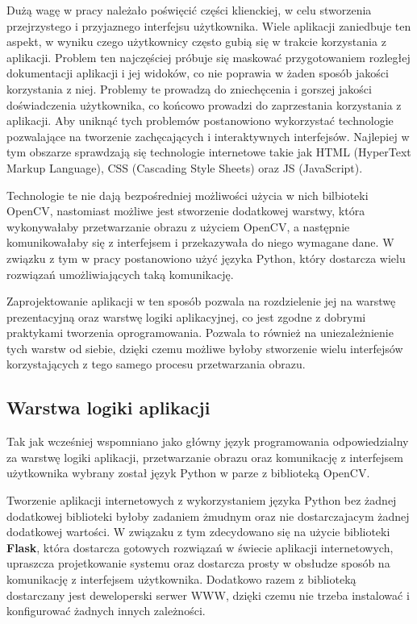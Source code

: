 \documentclass[10pt,polish,a4paper,oneside]{ppfcmthesis}
\begin{document}
Dużą wagę w pracy należało poświęci\'c części klienckiej, w celu stworzenia przejrzystego i
przyjaznego interfejsu użytkownika. Wiele aplikacji zaniedbuje ten aspekt, w wyniku czego
użytkownicy często gubią się w trakcie korzystania z aplikacji. Problem ten najczęściej próbuje
się maskowa\'c przygotowaniem rozległej dokumentacji aplikacji i jej widoków, co nie poprawia
w żaden sposób jakości korzystania z niej. Problemy te prowadzą do zniechęcenia i gorszej jakości
doświadczenia użytkownika, co końcowo prowadzi do zaprzestania korzystania z aplikacji. Aby
unikną\'c tych problemów postanowiono wykorzysta\'c technologie pozwalające na tworzenie
zachęcających i interaktywnych interfejsów. Najlepiej w tym obszarze sprawdzają się technologie
internetowe takie jak HTML (HyperText Markup Language), CSS (Cascading Style Sheets) oraz JS
(JavaScript).

Technologie te nie dają bezpośredniej możliwości użycia w nich bilbioteki OpenCV, nastomiast
możliwe jest stworzenie dodatkowej warstwy, która wykonywałaby przetwarzanie obrazu z
użyciem OpenCV, a następnie komunikowałaby się z interfejsem i przekazywała do niego
wymagane dane. W związku z tym w pracy postanowiono uży\'c języka Python, który dostarcza wielu
rozwiązań umożliwiających taką komunikację.\newline

Zaprojektowanie aplikacji w ten sposób pozwala na rozdzielenie jej na warstwę prezentacyjną
oraz warstwę logiki aplikacyjnej, co jest zgodne z dobrymi praktykami tworzenia oprogramowania.
Pozwala to również na uniezależnienie tych warstw od siebie, dzięki czemu możliwe
byłoby stworzenie wielu interfejsów korzystających z tego samego procesu przetwarzania obrazu.

\subsection{Warstwa logiki aplikacji}

Tak jak wcześniej wspomniano jako główny język programowania odpowiedzialny za warstwę logiki
aplikacji, przetwarzanie obrazu oraz komunikację z interfejsem użytkownika wybrany został język
Python w parze z biblioteką OpenCV.

Tworzenie aplikacji internetowych z wykorzystaniem języka Python bez żadnej dodatkowej
biblioteki byłoby zadaniem żmudnym oraz nie dostarczajacym żadnej dodatkowej wartości. W związaku
z tym zdecydowano się na użycie biblioteki \textbf{Flask}, która dostarcza gotowych rozwiązań
w świecie aplikacji internetowych, upraszcza projetkowanie systemu oraz dostarcza prosty w obsłudze
sposób na komunikację z interfejsem użytkownika. Dodatkowo razem z biblioteką dostarczany jest
deweloperski serwer WWW, dzięki czemu nie trzeba instalowa\'c i konfigurowa\'c żadnych innych zależności.
\newline
\end{document}
